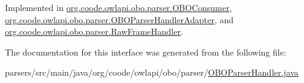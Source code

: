 Implemented in \hyperlink{classorg_1_1coode_1_1owlapi_1_1obo_1_1parser_1_1_o_b_o_consumer_aaa87c4a419fe29c4c8c624362585812d}{org.\-coode.\-owlapi.\-obo.\-parser.\-O\-B\-O\-Consumer}, \hyperlink{classorg_1_1coode_1_1owlapi_1_1obo_1_1parser_1_1_o_b_o_parser_handler_adapter_a746801b0b10e7947706f42cdde120f30}{org.\-coode.\-owlapi.\-obo.\-parser.\-O\-B\-O\-Parser\-Handler\-Adapter}, and \hyperlink{classorg_1_1coode_1_1owlapi_1_1obo_1_1parser_1_1_raw_frame_handler_aedb613cecc15a1b2ddf2ca768951d686}{org.\-coode.\-owlapi.\-obo.\-parser.\-Raw\-Frame\-Handler}.



The documentation for this interface was generated from the following file\-:\begin{DoxyCompactItemize}
\item 
parsers/src/main/java/org/coode/owlapi/obo/parser/\hyperlink{_o_b_o_parser_handler_8java}{O\-B\-O\-Parser\-Handler.\-java}\end{DoxyCompactItemize}
